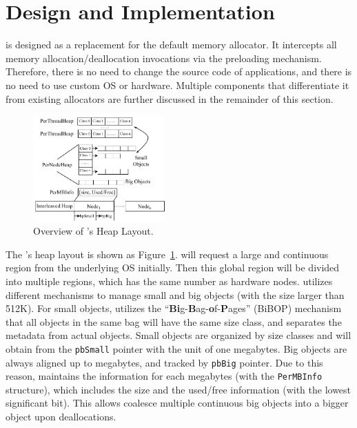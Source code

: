 \section{Design and Implementation}
\label{sec:implement}

\NM{} is designed as a replacement for the default memory allocator. It intercepts all memory allocation/deallocation invocations via the preloading mechanism. Therefore, there is no need to change the source code of applications, and there is no need to use custom OS or hardware. Multiple components that differentiate it from existing allocators are further discussed in the remainder of this section.

\begin{figure}[!ht]
\begin{center}
\includegraphics[width=0.45\textwidth]{figure/heaplayout1}
\end{center}
\vspace{-0.1in}
\caption{Overview of \NA{}'s Heap Layout.
\label{fig:overview}}
\vspace{-0.1in}
\end{figure}

The \NM{}'s heap layout is shown as Figure~\ref{fig:overview}. \NM{} will request a large and continuous region from the underlying OS initially. Then this global region will be divided into multiple regions, which has the same number as  hardware nodes. \NM{} utilizes different mechanisms to manage small and big objects (with the size larger than 512K). For small objects, \NM{} utilizes the ``\textbf{Bi}g-\textbf{B}ag-\textbf{o}f-\textbf{P}ages'' (BiBOP) mechanism that all objects in the same bag will have the same size class, and separates the metadata from actual objects. Small objects are organized by size classes and will obtain from the \texttt{pbSmall} pointer with the unit of one megabytes. Big objects are always aligned up to megabytes, and tracked by \texttt{pbBig} pointer. Due to this reason, \NM{} maintains the information for each megabytes (with the \texttt{PerMBInfo} structure), which includes the size and the used/free information (with the lowest significant bit). This allows  \NM{} coalesce multiple continuous big objects into a bigger object upon deallocations.  

